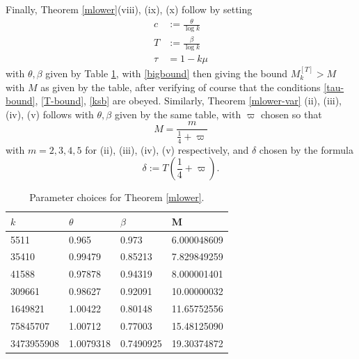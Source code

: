 Finally, Theorem \ref{mlower}(viii), (ix), (x) follow by setting
\begin{align*}
c &:= \frac{\theta}{\log k} \\
T &:= \frac{\beta}{\log k} \\
\tau &= 1 - k\mu
\end{align*}
with $\theta,\beta$ given by Table \ref{narrow-table}, with \eqref{bigbound} then giving the bound $M_k^{[T]} > M$ with $M$ as given by the table, after verifying of course that the conditions \eqref{tau-bound}, \eqref{T-bound}, \eqref{ksb} are obeyed.  Similarly, Theorem \ref{mlower-var} (ii), (iii), (iv), (v) follows with $\theta,\beta$ given by the same table, with $\varpi$ chosen so that
$$ M = \frac{m}{\frac{1}{4}+\varpi} $$
with $m=2,3,4,5$ for (ii), (iii), (iv), (v) respectively, and $\delta$ chosen by the formula
$$ \delta := T (\frac{1}{4} + \varpi).$$

\begin{table}
\centering
 \caption{Parameter choices for Theorem \ref{mlower}.}
 \label{narrow-table}
  \begin{tabular}{llll}
   \toprule
     $k$    & $\theta$   & $\beta$          &M \\
   \midrule
           5511 & 0.965              & 0.973               & 6.000048609 \\ 
          35410 & 0.99479            & 0.85213             & 7.829849259 \\ [0.5ex]
          41588 & 0.97878  	         & 0.94319             & 8.000001401 \\
         309661 & 0.98627            & 0.92091             & 10.00000032 \\ [0.5ex]
				1649821 & 1.00422            & 0.80148             & 11.65752556 \\  
       75845707 & 1.00712            & 0.77003             & 15.48125090 \\  [0.5ex]
     3473955908 & 1.0079318          & 0.7490925           & 19.30374872 \\  
   \bottomrule
  \end{tabular}
\end{table}
